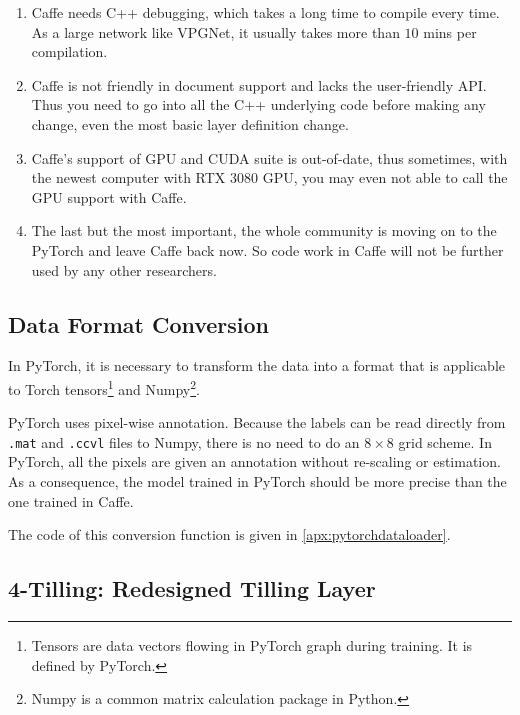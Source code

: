 \begin{spacing}{1.5}
\begin{enumerate}

    \item Caffe needs C++ debugging, which takes a long time to compile every time. As a large network like VPGNet, it usually takes more than $10$ mins per compilation.

    \item Caffe is not friendly in document support and lacks the user-friendly API. Thus you need to go into all the C++ underlying code before making any change, even the most basic layer definition change. 

    \item Caffe's support of GPU and CUDA suite is out-of-date, thus sometimes, with the newest computer with RTX 3080 GPU, you may even not able to call the GPU support with Caffe. 

    \item The last but the most important, the whole community is moving on to the PyTorch and leave Caffe back now. So code work in Caffe will not be further used by any other researchers.
    
\end{enumerate}

\subsection{Data Format Conversion}

In PyTorch, it is necessary to transform the data into a format that is applicable to Torch tensors\footnote{Tensors are data vectors flowing in PyTorch graph during training. It is defined by PyTorch.} and Numpy\footnote{Numpy is a common matrix calculation package in Python.}. 

PyTorch uses pixel-wise annotation. Because the labels can be read directly from \texttt{.mat} and \texttt{.ccvl} files to Numpy, there is no need to do an $8 \times 8$ grid scheme. In PyTorch, all the pixels are given an annotation without re-scaling or estimation. As a consequence, the model trained in PyTorch should be more precise than the one trained in Caffe.

The code of this conversion function is given in \autoref{apx:pytorchdataloader}.

\subsection{4-Tilling: Redesigned Tilling Layer}


\end{spacing}

